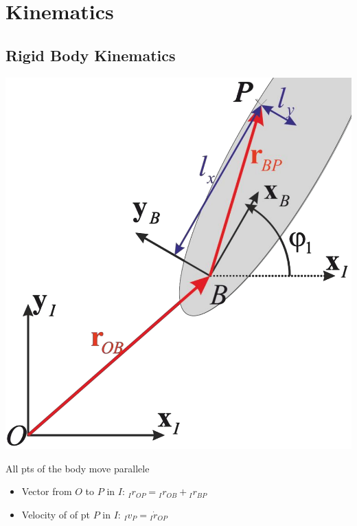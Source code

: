 
\section{Kinematics}
\subsection{Rigid Body Kinematics}
\begin{minipage}[b]{0.43\linewidth}
    \includegraphics[width=\linewidth]{./Figures/03_RigidBodyTransformation.png}
\end{minipage}
\begin{minipage}[b]{0.55\linewidth}
    \raggedright
    \begin{itemize}
         All pts of the body move parallele
            \begin{itemize}
                \item Vector from $O$ to $P$ in $I$: ${}_I r_{OP} = {}_I r_{OB} + {}_I r_{BP}$
                \item Velocity of of pt $P$ in $I$: ${}_I v_P = {}_I \dot r_{OP}$
            \end{itemize}
    \end{itemize}
\end{minipage}
